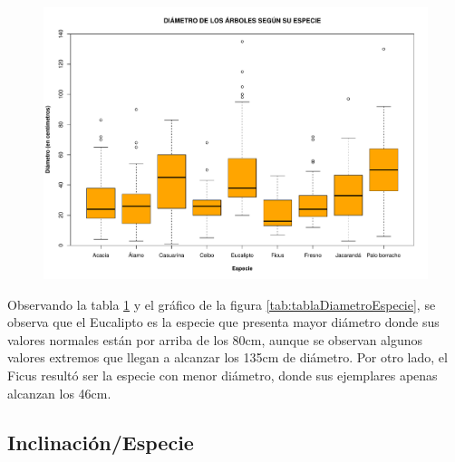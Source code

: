 \documentclass[11pt]{article}
\begin{document}
\begin{figure}[h!]
  \begin{center}
    \includegraphics[width=0.9\linewidth]{boxDiametroEspecie.pdf}
    \caption{}
    \label{fig:boxDiametroEspecie}
  \end{center}  
\end{figure}

\begin{justify}
  Observando la tabla \ref{fig:boxDiametroEspecie} y el gráfico
  de la figura \ref{tab:tablaDiametroEspecie}, se observa que el Eucalipto es la
  especie que presenta mayor diámetro donde sus valores normales están
  por arriba de los 80cm, aunque se observan algunos valores extremos que llegan
  a alcanzar los 135cm de diámetro. Por otro lado, el Ficus resultó ser la
  especie con menor diámetro, donde sus ejemplares apenas alcanzan los 46cm.
\end{justify}


\newpage
\subsection{Inclinación/Especie}
\end{document}
